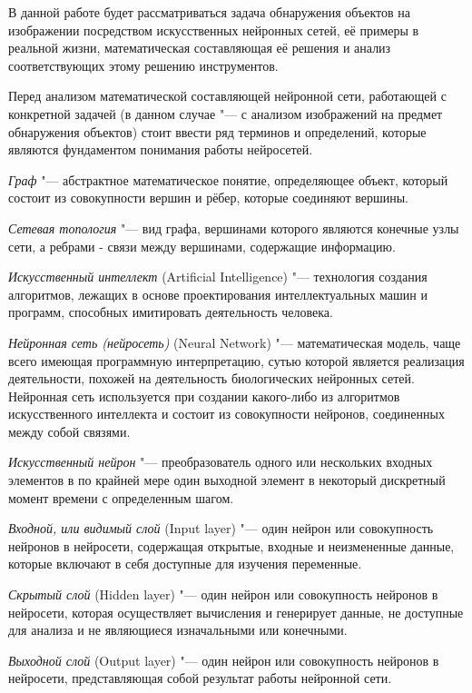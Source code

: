 \documentclass[bachelor, och, coursework]{SCWorks}
\begin{document}
    В данной работе будет рассматриваться задача обнаружения объектов на изображении посредством искусственных нейронных сетей, её примеры в реальной жизни, математическая составляющая её решения и анализ соответствующих этому решению инструментов.


    Перед анализом математической составляющей нейронной сети, работающей с конкретной задачей (в данном случае "--- с анализом изображений на предмет обнаружения объектов) стоит ввести ряд терминов и определений, которые являются фундаментом понимания работы нейросетей.

    \textit{Граф} "--- абстрактное математическое понятие, определяющее объект, который состоит из совокупности вершин и рёбер, которые соединяют вершины.

    \textit{Сетевая топология} "--- вид графа, вершинами которого являются конечные узлы сети, а ребрами - связи между вершинами, содержащие информацию.

    \textit{Искусственный интеллект} (Artificial Intelligence) "--- технология создания алгоритмов, лежащих в основе проектирования интеллектуальных машин и программ, способных имитировать деятельность человека.

    \textit{Нейронная сеть (нейросеть)} (Neural Network) "--- математическая модель, чаще всего имеющая программную интерпретацию, сутью которой является реализация деятельности, похожей на деятельность биологических нейронных сетей. Нейронная сеть используется при создании какого-либо из алгоритмов искусственного интеллекта и состоит из совокупности нейронов, соединенных между собой связями. 

    \textit{Искусственный нейрон} "--- преобразователь одного или нескольких входных элементов в по крайней мере один выходной элемент в некоторый дискретный момент времени с определенным шагом.

    \textit{Входной, или видимый слой} (Input layer) "--- один нейрон или совокупность нейронов в нейросети, содержащая открытые, входные и неизмененные данные, которые включают в себя доступные для изучения переменные.

    \textit{Скрытый слой} (Hidden layer) "--- один нейрон или совокупность нейронов в нейросети, которая осуществляет вычисления и генерирует данные, не доступные для анализа и не являющиеся изначальными или конечными.

    \textit{Выходной слой} (Output layer) "--- один нейрон или совокупность нейронов в нейросети, представляющая собой результат работы нейронной сети.
\end{document}
